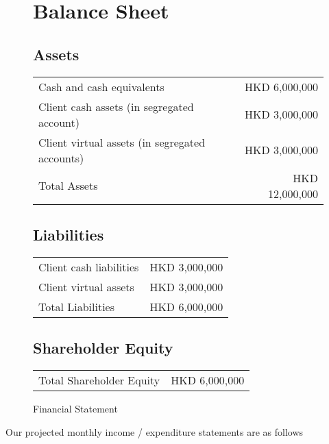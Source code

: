 \begin{figure}[h]
  \centering
  \caption{Financial Statement}
  \label{fig:financial_statement}
  
  \section*{Balance Sheet}
  
  \subsection*{Assets}
  \begin{tabular}{lr}
    Cash and cash equivalents & HKD 6,000,000 \\
    Client cash assets (in segregated account) & HKD 3,000,000 \\
    Client virtual assets (in segregated accounts) & HKD 3,000,000 \\
    \midrule
    Total Assets & HKD 12,000,000 \\
  \end{tabular}
  
  \subsection*{Liabilities}
  \begin{tabular}{lr}
    Client cash liabilities & HKD 3,000,000 \\
    Client virtual assets & HKD 3,000,000 \\
    \midrule
    Total Liabilities & HKD 6,000,000 \\
  \end{tabular}
  
  \subsection*{Shareholder Equity}
  \begin{tabular}{lr}
    Total Shareholder Equity & HKD 6,000,000 \\
  \end{tabular}  
\end{figure}

Our projected monthly income / expenditure statements are as follows

